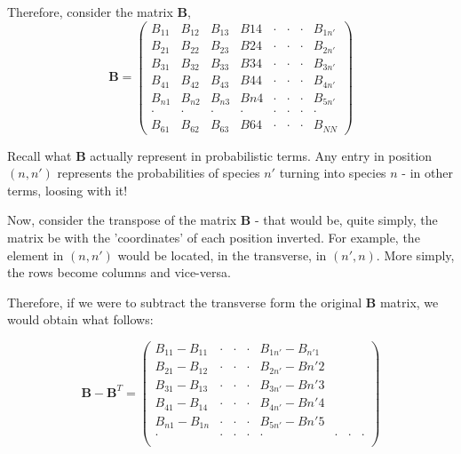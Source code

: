\documentclass[border=1pt]{article}
\begin{document}
Therefore, consider the matrix $\mathbf{B}$, 
\begin{equation}
	\mathbf{B}=
	\begin{pmatrix}
		B_{11} & B_{12} & B_{13} & B{14} & \cdot & \cdot & \cdot & B_{1n'}\\
		B_{21} & B_{22} & B_{23} & B{24} & \cdot & \cdot & \cdot & B_{2n'}\\
		B_{31} & B_{32} & B_{33} & B{34} & \cdot & \cdot & \cdot & B_{3n'}\\
		B_{41} & B_{42} & B_{43} & B{44} & \cdot & \cdot & \cdot & B_{4n'}\\
		B_{n1} & B_{n2} & B_{n3} & B{n4} & \cdot & \cdot & \cdot & B_{5n'}\\
		\cdot & \cdot & \cdot & \cdot & \cdot & \cdot & \cdot & \cdot\\
		B_{61} & B_{62} & B_{63} & B{64} & \cdot & \cdot & \cdot & B_{NN}
	\end{pmatrix}
\end{equation}

Recall what $\mathbf{B}$ actually represent in probabilistic terms. Any entry in position $(n, n')$ represents the probabilities of species $n'$ turning into species $n$ - in other terms, loosing with it!

Now, consider the transpose of the matrix $\mathbf{B}$ - that would be, quite simply, the matrix be with the 'coordinates' of each position inverted. For example, the element in $(n, n')$ would be located, in the transverse, in $(n', n)$. More simply, the rows become columns and vice-versa. 

Therefore, if we were to subtract the transverse form the original $\mathbf{B}$ matrix, we would obtain what follows: 

\begin{equation}
	\mathbf{B} - \mathbf{B}^T=
	\begin{pmatrix}
		B_{11}-B_{11} & \cdot & \cdot & \cdot & B_{1n'}-B_{n'1}\\
		B_{21}-B_{12} & \cdot & \cdot & \cdot & B_{2n'}-B{n'2}\\
		B_{31}-B_{13} & \cdot & \cdot & \cdot & B_{3n'}-B{n'3}\\
		B_{41}-B_{14} & \cdot & \cdot & \cdot & B_{4n'}-B{n'4}\\
		B_{n1} - B_{1n} & \cdot & \cdot & \cdot & B_{5n'}-B{n'5}\\
		\cdot & \cdot & \cdot & \cdot & \cdot & \cdot & \cdot & \cdot\\
	\end{pmatrix}
\end{equation}
\end{document}
